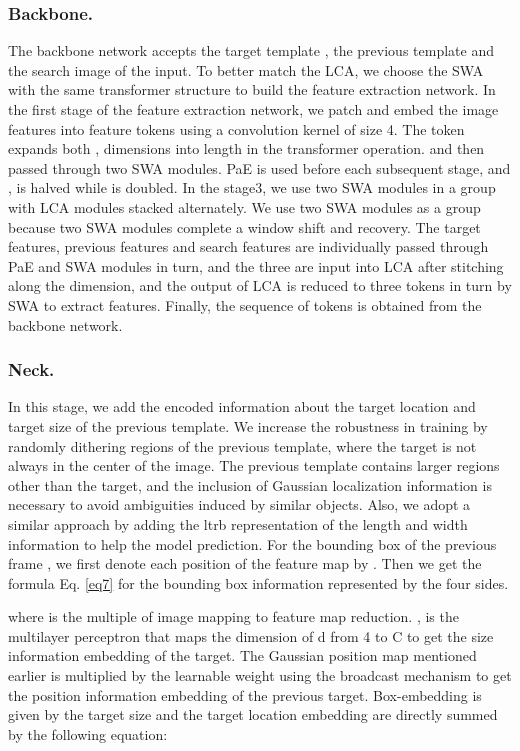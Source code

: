 \documentclass[letterpaper]{article} \usepackage{aaai23}  \usepackage{times}  \usepackage{helvet}  \usepackage{courier}  \usepackage[hyphens]{url}  \usepackage{graphicx} \urlstyle{rm} \def\UrlFont{\rm}  \usepackage{natbib}  \usepackage{caption} \frenchspacing  \setlength{\pdfpagewidth}{8.5in}  \setlength{\pdfpageheight}{11in}  \usepackage{algorithm}
\begin{document}
\subsubsection{Backbone.}
The backbone network accepts the target template , the previous template  and the search image  of the input. To better match the LCA, we choose the SWA with the same transformer structure to build the feature extraction network. In the first stage of the feature extraction network, we patch and embed the image features into  feature tokens using a convolution kernel of size 4. The token expands both ,  dimensions into length  in the transformer operation. and then passed through two SWA modules. PaE is used before each subsequent stage, and ,  is halved while  is doubled. In the stage3, we use two SWA modules in a group with LCA modules stacked alternately. We use two SWA modules as a group because two SWA modules complete a window shift and recovery. The target features, previous features and search features are individually passed through PaE and SWA modules in turn, and the three are input into LCA after stitching along the  dimension, and the output of LCA is reduced to three tokens in turn by SWA to extract features. Finally, the sequence of  tokens is obtained from the backbone network.

\subsubsection{Neck.}
In this stage, we add the encoded information about the target location and target size of the previous template. We increase the robustness in training by randomly dithering regions of the previous template, where the target is not always in the center of the image. The previous template contains larger regions other than the target, and the inclusion of Gaussian localization information is necessary to avoid ambiguities induced by similar objects. Also, we adopt a similar approach by adding the ltrb representation \cite{tomp} of the length and width information to help the model prediction. For the bounding box of the previous frame , we first denote each position of the feature map by  . Then we get the formula Eq. \ref{eq7} for the bounding box information  represented by the four sides.
 
where  is the multiple of image mapping to feature map reduction. ,  is the multilayer perceptron that maps the dimension of d from 4 to C to get the size information embedding of the target. The Gaussian position map  mentioned earlier is multiplied by the learnable weight  using the broadcast mechanism to get the position information embedding of the previous target. Box-embedding is given by the target size and the target location embedding are directly summed by the following equation:
 
\end{document}
